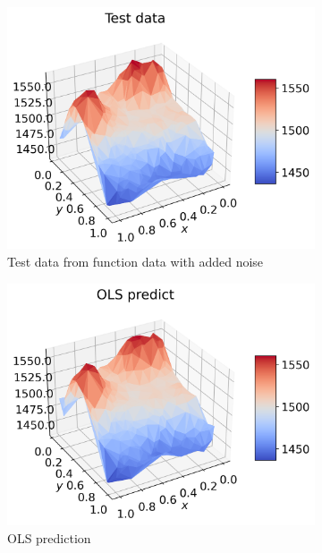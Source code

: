 \documentclass[12pt]{article}
\begin{document}
\begin{figure}[H]
  \begin{subfigure}{.5\textwidth}
    \centering
    \includegraphics[width=\textwidth]{../figures/test_data_n40.png}
    \caption{Test data from function data with added noise}
    \label{fig:real_pred_test}
  \end{subfigure}
  \begin{subfigure}{.5\textwidth}
    \centering
    \includegraphics[width=\textwidth]{../figures/ols_pred_n40.png}
    \caption{OLS prediction}
    \label{fig:real_pred_ols}
  \end{subfigure}
  \begin{subfigure}{.5\textwidth}

\end{subfigure}
\end{figure}
\end{document}
